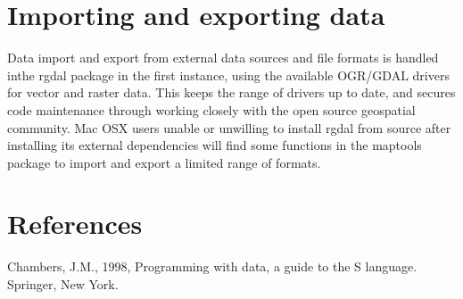 \documentclass{article}
\newcommand{\strong}[1]{{\normalfont\fontseries{b}\selectfont #1}}
\let\pkg=\strong
\begin{document}
\section{Importing and exporting data}

Data import and export from external data sources and file formats
is handled inthe \pkg{rgdal} package in the first instance, using the
available OGR/GDAL drivers for vector and raster data. This keeps the
range of drivers up to date, and secures code maintenance through working
closely with the open source geospatial community. Mac OSX users unable
or unwilling to install \pkg{rgdal} from source after installing its
external dependencies will find some functions in the \pkg{maptools}
package to import and export a limited range of formats.


\section*{References}
\begin{description}
\item Chambers, J.M., 1998, Programming with data, a guide to the S language.
Springer, New York.
\end{description}
\end{document}
